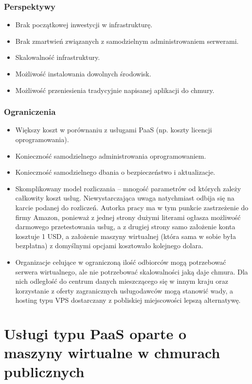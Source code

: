 \documentclass[12pt,a4paper,twoside,titlepage,openright]{book}
\begin{document}
\subsubsection{Perspektywy}
\begin{itemize}
\item Brak początkowej inwestycji w infrastrukturę.
\item Brak zmartwień związanych z samodzielnym administrowaniem serwerami.
\item Skalowalność infrastruktury.
\item Możliwość instalowania dowolnych środowisk.
\item Możliwość przeniesienia tradycyjnie napisanej aplikacji do chmury.
\end{itemize}

\subsubsection{Ograniczenia}
\begin{itemize}
\item Większy koszt w porównaniu z usługami PaaS (np. koszty licencji oprogramowania).
\item Konieczność samodzielnego administrowania oprogramowaniem.
\item Konieczność samodzielnego dbania o bezpieczeństwo i aktualizacje.
\item Skomplikowany model rozliczania -- mnogość parametrów od których zależy całkowity koszt usług. Niewystarczająca uwaga natychmiast odbija się na karcie podanej do rozliczeń. Autorka pracy ma w tym punkcie zastrzeżenie do firmy Amazon, ponieważ z jednej strony dużymi literami ogłasza możliwość darmowego przetestowania usług, a z drugiej strony samo założenie konta kosztuje 1 USD, a założenie maszyny wirtualnej (która sama w sobie była bezpłatna) z domyślnymi opcjami kosztowało kolejnego dolara. 
\item Organizacje celujące w ograniczoną ilość odbiorców mogą potrzebować serwera wirtualnego, ale nie potrzebować skalowalności jaką daje chmura. Dla nich odległość do centrum danych mieszczącego się w innym kraju oraz korzystanie z oferty zagranicznych usługodawców mogą stanowić wady, a hosting typu VPS dostarczany z pobliskiej miejscowości lepszą alternatywę.
\end{itemize}

\section{Usługi typu PaaS oparte o maszyny wirtualne w chmurach publicznych}\label{section:podejsciePaas}
\end{document}
